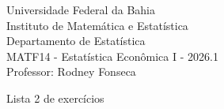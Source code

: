 \documentclass{article}
\date{--/--/----} %
\begin{document}
\begin{flushleft}
	Universidade Federal da Bahia\\
	Instituto de Matemática e Estatística\\
	Departamento de Estatística\\
	MATF14 - Estatística Econômica I - 2026.1\\
	Professor: Rodney Fonseca \\
\end{flushleft}

\begin{center}
	\begin{Large}
		Lista 2 de exercícios \\
	\end{Large}	
\end{center}





\vspace{2em}
\end{document}
